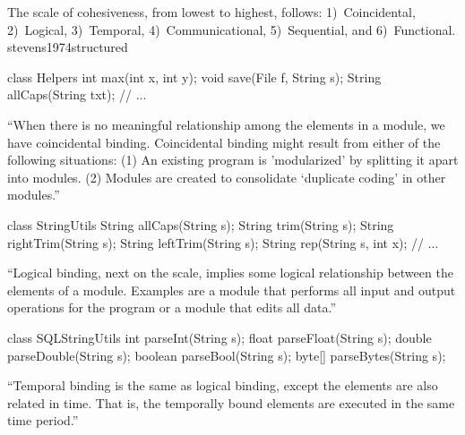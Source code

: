 \documentclass{article}
\begin{document}

  {The scale of cohesiveness, from lowest to highest, follows:
    1)~Coincidental,
    2)~Logical,
    3)~Temporal,
    4)~Communicational,
    5)~Sequential,
    and
    6)~Functional.}
  {stevens1974structured}

\begin{multicols}{2}
{\small\begin{ffcode}
class Helpers {
  int max(int x, int y);
  void save(File f, String s);
  String allCaps(String txt);
  // ...
}
\end{ffcode}
}
\par\columnbreak\par
``When there is no meaningful relationship among the elements in a module, we have coincidental binding. Coincidental binding
might result from either of the following situations: (1) An existing program is 'modularized' by splitting it apart into modules. (2) Modules are created to consolidate `duplicate coding' in other modules.''
\end{multicols}
\plush{}

\begin{multicols}{2}
{\small\begin{ffcode}
class StringUtils {
  String allCaps(String s);
  String trim(String s);
  String rightTrim(String s);
  String leftTrim(String s);
  String rep(String s, int x);
  // ...
}
\end{ffcode}
}
\par\columnbreak\par
``Logical binding, next on the scale, implies some logical relationship between the elements of a module. Examples are a module that performs all input and output operations for the program or a module that edits all data.''
\end{multicols}
\plush{}

\begin{multicols}{2}
{\small\begin{ffcode}
class SQLStringUtils {
  int parseInt(String s);
  float parseFloat(String s);
  double parseDouble(String s);
  boolean parseBool(String s);
  byte[] parseBytes(String s);
}
\end{ffcode}
}
\par\columnbreak\par
``Temporal binding is the same as logical binding, except the elements are also related in time. That is, the temporally bound elements are executed in the same time period.''
\end{multicols}
\plush{}
\end{document}
